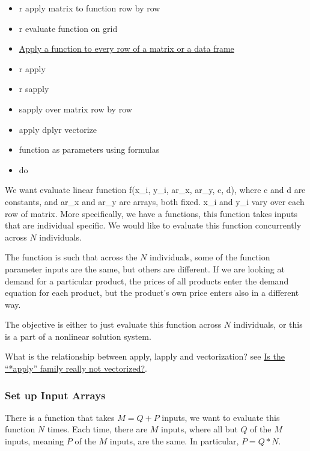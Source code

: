\documentclass[
]{book}
\providecommand{\tightlist}{%
  \setlength{\itemsep}{0pt}\setlength{\parskip}{0pt}}
\begin{document}
\begin{itemize}
\tightlist
\item
  r apply matrix to function row by row
\item
  r evaluate function on grid
\item
  \href{https://stackoverflow.com/questions/4236368/apply-a-function-to-every-row-of-a-matrix-or-a-data-frame}{Apply a function to every row of a matrix or a data frame}
\item
  r apply
\item
  r sapply
\item
  sapply over matrix row by row
\item
  apply dplyr vectorize
\item
  function as parameters using formulas
\item
  do
\end{itemize}

We want evaluate linear function f(x\_i, y\_i, ar\_x, ar\_y, c, d), where c and d are constants, and ar\_x and ar\_y are arrays, both fixed. x\_i and y\_i vary over each row of matrix. More specifically, we have a functions, this function takes inputs that are individual specific. We would like to evaluate this function concurrently across \(N\) individuals.

The function is such that across the \(N\) individuals, some of the function parameter inputs are the same, but others are different. If we are looking at demand for a particular product, the prices of all products enter the demand equation for each product, but the product's own price enters also in a different way.

The objective is either to just evaluate this function across \(N\) individuals, or this is a part of a nonlinear solution system.

What is the relationship between apply, lapply and vectorization? see \href{https://stackoverflow.com/a/29006276/8280804}{Is the ``*apply'' family really not vectorized?}.

\hypertarget{set-up-input-arrays-2}{%
\subsubsection{Set up Input Arrays}\label{set-up-input-arrays-2}}

There is a function that takes \(M=Q+P\) inputs, we want to evaluate this function \(N\) times. Each time, there are \(M\) inputs, where all but \(Q\) of the \(M\) inputs, meaning \(P\) of the \(M\) inputs, are the same. In particular, \(P=Q*N\).
\end{document}
